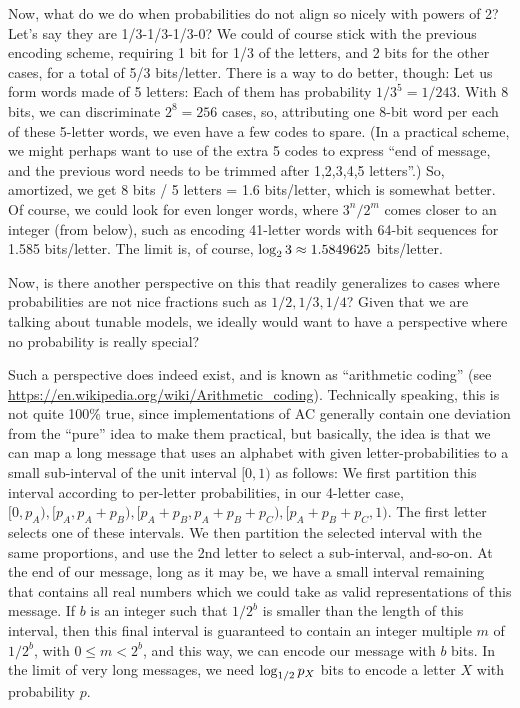\documentclass[11pt]{article}
\def\lt{<}
\begin{document}
Now, what do we do when probabilities do not align so nicely with powers
of 2? Let's say they are 1/3-1/3-1/3-0? We could of course stick with
the previous encoding scheme, requiring 1 bit for 1/3 of the letters,
and 2 bits for the other cases, for a total of 5/3 bits/letter. There is
a way to do better, though: Let us form words made of 5 letters: Each of
them has probability \(1/3^5=1/243\). With 8 bits, we can discriminate
\(2^8=256\) cases, so, attributing one 8-bit word per each of these
5-letter words, we even have a few codes to spare. (In a practical
scheme, we might perhaps want to use of the extra 5 codes to express
``end of message, and the previous word needs to be trimmed after
1,2,3,4,5 letters''.) So, amortized, we get 8 bits / 5 letters = 1.6
bits/letter, which is somewhat better. Of course, we could look for even
longer words, where \(3^n/2^m\) comes closer to an integer (from below),
such as encoding 41-letter words with 64-bit sequences for 1.585
bits/letter. The limit is, of course,
\({\rm log}_{2}\,3\approx1.5849625\) bits/letter.

Now, is there another perspective on this that readily generalizes to
cases where probabilities are not nice fractions such as
\(1/2, 1/3, 1/4\)? Given that we are talking about tunable models, we
ideally would want to have a perspective where no probability is really
special?

Such a perspective does indeed exist, and is known as ``arithmetic
coding'' (see \url{https://en.wikipedia.org/wiki/Arithmetic_coding}).
Technically speaking, this is not quite 100\% true, since
implementations of AC generally contain one deviation from the ``pure''
idea to make them practical, but basically, the idea is that we can map
a long message that uses an alphabet with given letter-probabilities to
a small sub-interval of the unit interval \([0, 1)\) as follows: We
first partition this interval according to per-letter probabilities, in
our 4-letter case,
\([0, p_A), [p_A, p_A+p_B), [p_A+p_B,p_A+p_B+p_C), [p_A+p_B+p_C, 1)\).
The first letter selects one of these intervals. We then partition the
selected interval with the same proportions, and use the 2nd letter to
select a sub-interval, and-so-on. At the end of our message, long as it
may be, we have a small interval remaining that contains all real
numbers which we could take as valid representations of this message. If
\(b\) is an integer such that \(1/2^b\) is smaller than the length of
this interval, then this final interval is guaranteed to contain an
integer multiple \(m\) of \(1/2^b\), with \(0\le m\lt2^b\), and this
way, we can encode our message with \(b\) bits. In the limit of very
long messages, we need \({\rm log}_{1/2}\, p_X\) bits to encode a letter
\(X\) with probability \(p\).
\end{document}
